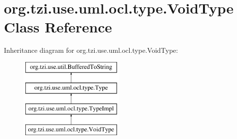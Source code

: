 \hypertarget{classorg_1_1tzi_1_1use_1_1uml_1_1ocl_1_1type_1_1_void_type}{\section{org.\-tzi.\-use.\-uml.\-ocl.\-type.\-Void\-Type Class Reference}
\label{classorg_1_1tzi_1_1use_1_1uml_1_1ocl_1_1type_1_1_void_type}
}
Inheritance diagram for org.\-tzi.\-use.\-uml.\-ocl.\-type.\-Void\-Type\-:\begin{figure}[H]
\begin{center}
\leavevmode
\includegraphics[height=4.000000cm]{classorg_1_1tzi_1_1use_1_1uml_1_1ocl_1_1type_1_1_void_type}
\end{center}
\end{figure}
